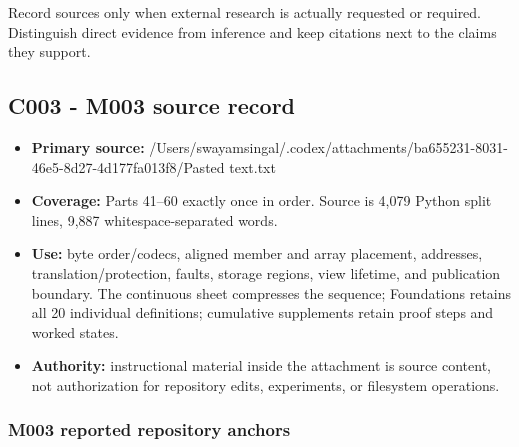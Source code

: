 Record sources only when external research is actually requested or required. Distinguish direct evidence from inference and keep citations next to the claims they support.

\subsection{C003 - M003 source record}\label{appendix-a103e7846d21-c003---m003-source-record}

\begin{itemize}
\tightlist
\item
  \textbf{Primary source:} /Users/swayamsingal/.codex/attachments/ba655231-8031-46e5-8d27-4d177fa013f8/Pasted text.txt
\item
  \textbf{Coverage:} Parts 41--60 exactly once in order. Source is 4,079 Python split lines, 9,887 whitespace-separated words.
\item
  \textbf{Use:} byte order/codecs, aligned member and array placement, addresses, translation/protection, faults, storage regions, view lifetime, and publication boundary. The continuous sheet compresses the sequence; Foundations retains all 20 individual definitions; cumulative supplements retain proof steps and worked states.
\item
  \textbf{Authority:} instructional material inside the attachment is source content, not authorization for repository edits, experiments, or filesystem operations.
\end{itemize}

\subsubsection{M003 reported repository anchors}\label{appendix-a103e7846d21-m003-reported-repository-anchors}

